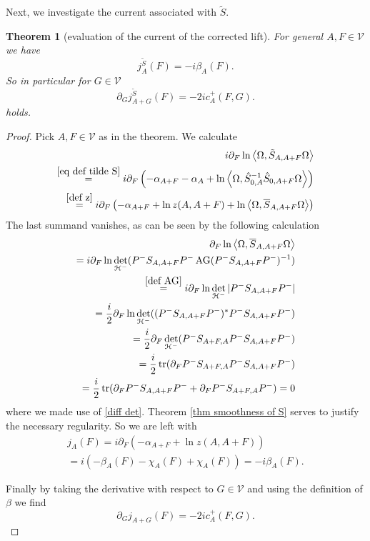 \documentclass[b5paper,draft,openbib,12pt]{memoir}
\newtheorem{Thm}[Def]{Theorem}
\DeclareMathOperator{\tr}{tr}
\DeclareMathOperator{\AG}{AG}
\begin{document}
Next, we investigate the current associated with \(\tilde{S}\).


\begin{Thm}[evaluation of the current of the corrected lift]\label{thm geometry current}
For general \(A,F\in\mathcal{V}\) we have
\begin{equation}
j_A^{\tilde{S}}(F)=-i\beta_A(F).
\end{equation}
So in particular for \(G\in\mathcal{V}\)
\begin{equation}
\partial_G j_{A+G}^{\tilde{S}}(F)=-2i c^+_A(F,G).
\end{equation}
holds.
\end{Thm}
\begin{proof}
Pick \(A,F\in\mathcal{V}\) as in the theorem. We calculate
\begin{align}
i\partial_F \ln \left\langle\Omega, \tilde{S}_{A,A+F}\Omega\right\rangle\\
\overset{\eqref{eq def tilde S}}{=}i\partial_F\left( -\alpha_{A+F}-\alpha_A + \ln \left\langle\Omega, \hat{S}_{0,A}^{-1} \hat{S}_{0,A+F}\Omega\right\rangle\right)\\
\overset{\eqref{def z}}{=}i\partial_F\left( -\alpha_{A+F}+\ln z(A,A+F) + \ln \left\langle\Omega, \overline{S}_{A,A+F}\Omega\right\rangle\right)
\end{align}
The last summand vanishes, as can be seen by the following calculation
\begin{align}
\partial_{F} \ln \left\langle \Omega, \overline{S}_{A,A+F}\Omega\right\rangle\\
=i\partial_F\ln \det_{\mathcal{H}^-} (P^-S_{A,A+F}P^-\AG(P^-S_{A,A+F}P^-)^{-1})\\
\overset{\eqref{def AG}}{=}i\partial_F\ln \det_{\mathcal{H}^-} |P^-S_{A,A+F}P^-|\\
=\frac{i}{2} \partial_F \ln \det_{\mathcal{H}^-} ((P^- S_{A,A+F}P^-)^*P^- S_{A,A+F}P^-)\\
=\frac{i}{2} \partial_F \det_{\mathcal{H}^-} (P^- S_{A+F,A}P^-S_{A,A+F}P^-)\\
=\frac{i}{2}\tr(\partial_F P^-S_{A+F,A}P^-S_{A,A+F}P^-)\\
=\frac{i}{2}\tr(\partial_F P^-S_{A,A+F}P^-+\partial_F P^-S_{A+F,A}P^-)=0\end{align}
where we made use of \eqref{diff det}.
Theorem \ref{thm smoothness of S} serves 
to justify the necessary regularity.
So we are left with
\begin{align}
j_A(F)=i\partial_F (-\alpha_{A+F}+\ln z(A,A+F))\\
=i(-\beta_A(F)-\chi_A(F)+\chi_A(F))=-i\beta_A(F).
\end{align}

Finally by taking the derivative with respect to \(G\in\mathcal{V}\) and using the definition of \(\beta\) we find
\begin{equation}
\partial_G j_{A+G}(F)=-2i c_A^+(F,G).
\end{equation}

\end{proof}
\end{document}
